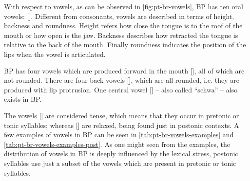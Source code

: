 With respect to vowels, as can be observed in \autoref{fig:pt-br-vowels}, \ac{BP} has ten oral vowels: []. Different from consonants, vowels are described in terms of height, backness and roundness. Height refers how close the tongue is to the roof of the mouth or how open is the jaw. Backness describes how retracted the tongue is relative to the back of the mouth. Finally roundness indicates the position of the lips when the vowel is articulated.

\ac{BP} has four vowels which are produced forward in the mouth [], all of which are not rounded. There are four back vowels [], which are all rounded, i.e. they are produced with lip protrusion. One central vowel [] -- also called ``schwa'' -- also exists in \ac{BP}.

The vowels [] are considered tense, which means that they occur in pretonic or tonic syllables; whereas [] are relaxed, being found just in postonic contexts. A few examples of vowels in \ac{BP} can be seen in \autoref{tab:pt-br-vowels-examples} and \autoref{tab:pt-br-vowels-examples-post}. As one might seen from the examples, the distribution of vowels in \ac{BP} is deeply influenced by the lexical stress, postonic syllables use just a subset of the vowels which are present in pretonic or tonic syllables.

